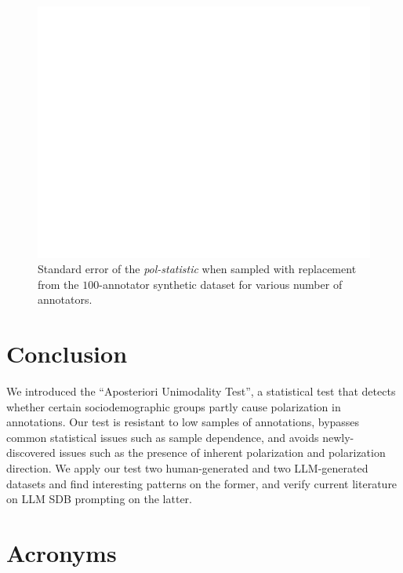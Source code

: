 \documentclass{article}
\begin{document}
\begin{figure}
	\includegraphics[width=\linewidth]{ndfu_std_error_sample_size.png}
	\caption{Standard error of the \textit{pol-statistic} when sampled with replacement from the $100$-annotator synthetic dataset for various number of annotators.}
	\label{fig::std_error}
\end{figure}


\section{Conclusion}

We introduced the ``Aposteriori Unimodality Test'', a statistical test that detects whether certain sociodemographic groups partly cause polarization in annotations. Our test is resistant to low samples of annotations, bypasses common statistical issues such as sample dependence, and avoids newly-discovered issues such as the presence of inherent polarization and polarization direction. We apply our test two human-generated and two \ac{LLM}-generated datasets and find interesting patterns on the former, and verify current literature on \ac{LLM} \ac{SDB} prompting on the latter.


\section{Acronyms}

\begin{acronym}[WWW]
\end{acronym}

\printbibliography
\end{document}

